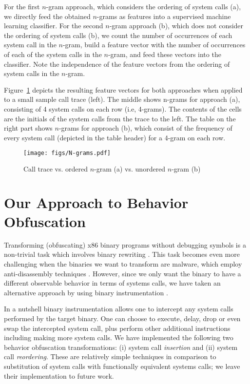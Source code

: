 \documentclass{llncs}
\begin{document}
For the first $n$-gram approach, which considers the ordering of system calls (a), we directly feed the obtained $n$-grams as features into a supervised machine learning classifier. 
For the second $n$-gram approach (b), which does not consider the ordering of system calls (b), we count the number of occurrences of each system call in the $n$-gram, build a feature vector with the number of occurrences of each of the system calls in the $n$-gram, and feed these vectors into the classifier.
Note the independence of the feature vectors from the ordering of system calls in the $n$-gram. 


Figure~\ref{fig:ngram} depicts the resulting feature vectors for both approaches when applied to a small sample call trace (left). The middle shows n-grams for approach (a), consisting of 4 system calls on each row (i.e, 4-grams). The contents of the cells are the initials of the system calls from the trace to the left. The table on the right part shows $n$-grams for approach (b), which consist of the frequency of every system call (depicted in the table header) for a 4-gram on each row. 

\begin{figure}[t]
\begin{center}
	\vspace{-1em}
		\texttt{[image: figs/N-grams.pdf]}\vspace{-0.5em}
	\caption{Call trace vs. ordered $n$-gram (a) vs. unordered $n$-gram (b)} \vspace{-2em}
	\label{fig:ngram}
\end{center}
\end{figure} 
 
\section{Our Approach to Behavior Obfuscation}
\label{sec:approach}

Transforming (obfuscating) x86 binary programs without debugging symbols is a non-trivial task which involves binary rewriting \cite{prasad2003binary}. This task becomes even more challenging when the binaries we want to transform are malware, which employ anti-disassembly techniques \cite{eagle2011ida}. However, since we only want the binary to have a different observable behavior in terms of systems calls, we have taken an alternative approach by using binary instrumentation \cite{reddi2004pin}.

In a nutshell binary instrumentation allows one to intercept any system calls performed by the target binary. One can choose to execute, delay, drop or even swap the intercepted system call, plus perform other additional instructions including making more system calls. 
We have implemented the following two behavior obfuscation transformations: (i) system call \emph{insertion} and (ii) system call \emph{reordering}. These are relatively simple techniques in comparison to substitution of system calls with functionally equivalent systems calls; we leave their implementation to future work. 
\end{document}

